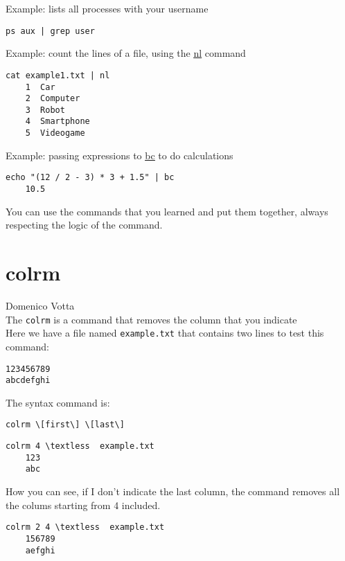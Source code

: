 \documentclass[hidelinks,12pt,a4paper,numbers=enddot]{scrartcl}
\begin{document}
Example: lists all processes with your username
\begin{verbatim}
ps aux | grep user
\end{verbatim}

Example: count the lines of a file, using the
\underline{\href{www.theshell.ch/pages/cmd/advanced/nl.html}{nl}} command
\begin{verbatim}
cat example1.txt | nl
    1  Car
    2  Computer
    3  Robot
    4  Smartphone
    5  Videogame
\end{verbatim}

Example: passing expressions to \underline{\href{www.theshell.ch/pages/cmd/advanced/bc.html}{bc}}
to do calculations
\begin{verbatim}
echo "(12 / 2 - 3) * 3 + 1.5" | bc
    10.5
\end{verbatim}

You can use the commands that you learned and put them together, always
respecting the logic of the command.

\section{colrm}


\large Domenico Votta \normalsize\\


The \texttt{colrm} is a command that removes the column that you indicate \\

Here we have a file named \texttt{example.txt} that contains two lines to test this command:\\

\begin{verbatim}
123456789
abcdefghi
\end{verbatim}

The syntax command is:
\begin{verbatim}
colrm \[first\] \[last\]
\end{verbatim}

\begin{verbatim}
colrm 4 \textless  example.txt
    123
    abc
\end{verbatim}

How you can see, if I don't indicate the last column, the command removes
all the colums starting from 4 included.
\begin{verbatim}
colrm 2 4 \textless  example.txt
    156789
    aefghi
\end{verbatim}
\end{document}
